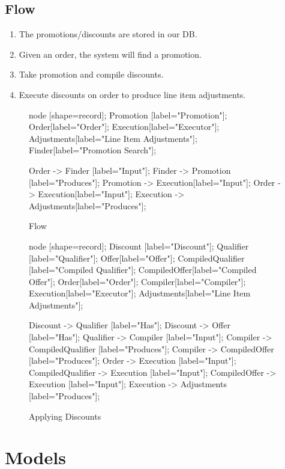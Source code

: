 \documentclass[11pt]{article}
\begin{document}
\subsection{Flow}

\begin{enumerate}

    \item The promotions/discounts are stored in our DB. 
    \item Given an order, the system will find a promotion.
    \item Take promotion and compile discounts.
    \item Execute discounts on order to produce line item adjustments.
\end{enumerate}

\begin{figure}
\caption{Flow}
 {
    node [shape=record];
    Promotion [label="Promotion"];
    Order[label="Order"];
    Execution[label="Executor"];
    Adjustments[label="Line Item Adjustments"];
    Finder[label="Promotion Search"];

    Order -> Finder [label="Input"];
    Finder -> Promotion [label="Produces"];
    Promotion -> Execution[label="Input"];
    Order -> Execution[label="Input"];
    Execution -> Adjustments[label="Produces"];
}
\end{figure}

\begin{figure}
\caption{Applying Discounts}
 {
    node [shape=record];
    Discount [label="Discount"];
    Qualifier [label="Qualifier"];
    Offer[label="Offer"];
    CompiledQualifier [label="Compiled Qualifier"];
    CompiledOffer[label="Compiled Offer"];
    Order[label="Order"];
    Compiler[label="Compiler"];
    Execution[label="Executor"];
    Adjustments[label="Line Item Adjustments"];

    Discount -> Qualifier [label="Has"];
    Discount -> Offer [label="Has"];
    Qualifier -> Compiler [label="Input"];
    Compiler -> CompiledQualifier [label="Produces"];
    Compiler -> CompiledOffer [label="Produces"];
    Order -> Execution [label="Input"];
    CompiledQualifier -> Execution [label="Input"];
    CompiledOffer -> Execution [label="Input"];
    Execution -> Adjustments [label="Produces"];
}
\end{figure}

\section{Models}
\end{document}
